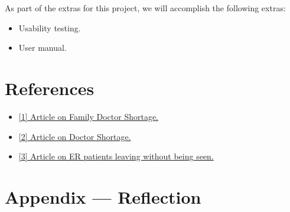 \documentclass{article}
\begin{document}
As part of the extras for this project, we will accomplish the following extras:
\begin{itemize}
    \item Usability testing.
    \item User manual.
\end{itemize}

\section{References}
\begin{itemize}
  \item 
  \href{https://www.cbc.ca/news/canada/toronto/ontario-family-doctor-shortage-record-high-1.7261558 }{[1] Article on Family Doctor Shortage.}
  \item 
  \href{https://www.cbc.ca/news/canada/toronto/family-doctor-shortage-oma-1.7097935}{[2] Article on Doctor Shortage.}
  \item 
  \href{https://www.ices.on.ca/publications/journal-articles/association-between-waiting-times-and-short-term-mortality-and-hospital-admission-after-departure-from-the-emergency-department-population-based-cohort-study-from-ontario-canada/}{[3] Article on ER patients leaving without being seen.}
\end {itemize}

\newpage{}

\section*{Appendix --- Reflection}


% 
\end{document}
